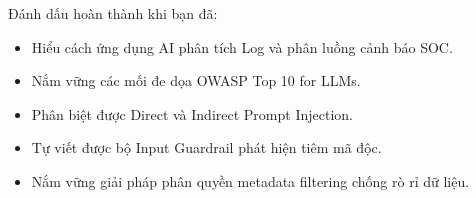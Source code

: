 \begin{checkpointbox}
Đánh dấu hoàn thành khi bạn đã:
\begin{itemize}
  \item[$\square$] Hiểu cách ứng dụng AI phân tích Log và phân luồng cảnh báo SOC.
  \item[$\square$] Nắm vững các mối đe dọa OWASP Top 10 for LLMs.
  \item[$\square$] Phân biệt được Direct và Indirect Prompt Injection.
  \item[$\square$] Tự viết được bộ Input Guardrail phát hiện tiêm mã độc.
  \item[$\square$] Nắm vững giải pháp phân quyền metadata filtering chống rò rỉ dữ liệu.
\end{itemize}
\end{checkpointbox}
